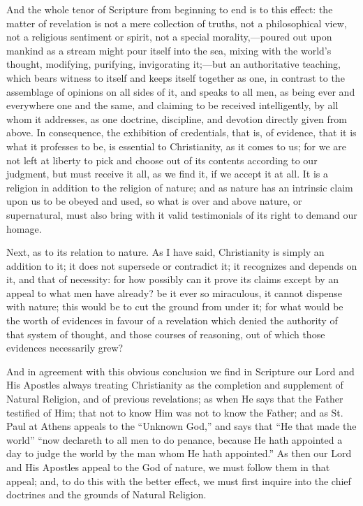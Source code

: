 And the whole tenor of Scripture from beginning to end is to this
effect: the matter of revelation is not a mere collection of truths,
not a philosophical view, not a religious sentiment or spirit, not a
special morality,—poured out upon mankind as a stream might pour
itself into the sea, mixing with the world's thought, modifying,
purifying, invigorating it;—but an authoritative teaching, which
bears witness to itself and keeps itself together as one, in contrast
to the assemblage of opinions on all sides of it, and speaks to all
men, as being ever and everywhere one and the same, and claiming to be
received intelligently, by all whom it addresses, as one doctrine,
discipline, and devotion directly given from above. In consequence,
the exhibition of credentials, that is, of evidence, that it is what
it professes to be, is essential to Christianity, as it comes to us;
for we are not left at liberty to pick and choose out of its contents
according to our judgment, but must receive it all, as we find it, if
we accept it at all. It is a religion in addition to the religion of nature; and as nature has an intrinsic claim upon us to be
obeyed and used, so what is over and above nature, or supernatural,
must also bring with it valid testimonials of its right to demand our
homage.

Next, as to its relation to nature. As I have said, Christianity is
simply an addition to it; it does not supersede or contradict it; it
recognizes and depends on it, and that of necessity: for how possibly
can it prove its claims except by an appeal to what men have already?
be it ever so miraculous, it cannot dispense with nature; this would
be to cut the ground from under it; for what would be the worth of
evidences in favour of a revelation which denied the authority of that
system of thought, and those courses of reasoning, out of which those
evidences necessarily grew?

And in agreement with this obvious conclusion we find in Scripture
our Lord and His Apostles always treating Christianity as the
completion and supplement of Natural Religion, and of previous
revelations; as when He says that the Father testified of Him; that
not to know Him was not to know the Father; and as St. Paul at Athens
appeals to the ``Unknown God,'' and says that ``He that
made the world'' ``now declareth to all men to do penance,
because He hath appointed a day to judge the world by the man whom He
hath appointed.'' As then our Lord and His Apostles appeal to the
God of nature, we must follow them in that appeal; and, to do this
with the better effect, we must first inquire into the chief doctrines
and the grounds of Natural Religion.

